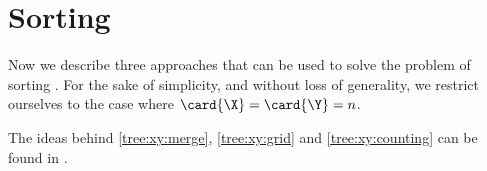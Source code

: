 \chapter{Sorting \XY}

Now we describe three approaches that can be used to solve the problem
of sorting \XY. For the sake of simplicity, and without loss of generality,
we restrict ourselves to the case where $\card{\X} = \card{\Y} = n$.

The ideas behind \ref{tree:xy:merge}, \ref{tree:xy:grid} and
\ref{tree:xy:counting} can be found in \citet*{harper:1975}.
